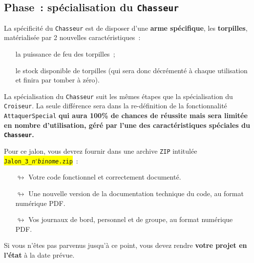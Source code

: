 \documentclass[10pt, fleqn, a4paper]{article}
\newcommand{\bfcolor}[2]{\textcolor{#1}{\textbf{#2}}}
\newcommand\myframecolor{}
\newcommand\mybgcolor{}
\newenvironment{mycolorbox}[2]
{
\def\myframecolor{#1}
\def\mybgcolor{#2}
\begingroup
\begin{lrbox}{\mytextbox}
\begin{minipage}[t]{\textwidth}
}
{
\end{minipage}\end{lrbox}
\fcolorbox{\myframecolor}{\mybgcolor}{\usebox{\mytextbox}}
\endgroup
}
\newcounter{quest}
\begin{document}
\addtocounter{quest}{1}
\subsection*{Phase~\thequest : spécialisation du \texttt{Chasseur}}
\label{phase_escadron}

La spécificité du \texttt{Chasseur} est de disposer d'une \bfcolor{blueTD}{arme spécifique}, les \bfcolor{blueTD}{torpilles}, matérialisée par 2 nouvelles caractéristiques~:
\begin{itemize}
\item[\ding{223}] la puissance de feu des torpilles~;
\item[\ding{223}] le \og{}stock\fg{} disponible de torpilles (qui sera donc décrémenté à chaque utilisation et finira par tomber à zéro).
\end{itemize}

La spécialisation du \texttt{Chasseur} suit les mêmes étapes que la spécialisation du \texttt{Croiseur}. La seule différence sera dans la re-définition de la fonctionnalité \texttt{AttaquerSpecial} \bfcolor{greenTP}{qui aura 100\% de chances de réussite mais sera limitée en nombre d'utilisation, géré par l'une des caractéristiques spéciales du \texttt{Chasseur}.}

\vspace{5mm}
\begin{mycolorbox}{black}{orange}
Pour ce jalon, vous devrez fournir dans une archive \texttt{ZIP} intitulée\\ \colorbox{yellow}{\texttt{Jalon\_3\_\textit{n$^\circ$binome}.zip}}~:
\begin{itemize}
\item[$\looparrowright$] Votre code fonctionnel et correctement documenté.
\item[$\looparrowright$] Une nouvelle version de la documentation technique du code, au format numérique PDF.
\item[$\looparrowright$] Vos journaux de bord, personnel et de groupe, au format numérique PDF.
\end{itemize}
\begin{mycolorbox}{black}{yellow}Si vous n'êtes pas parvenus jusqu'à ce point, vous devez rendre \textbf{votre projet en l'état} à la date prévue.\end{mycolorbox}
\end{mycolorbox}
\end{document}
